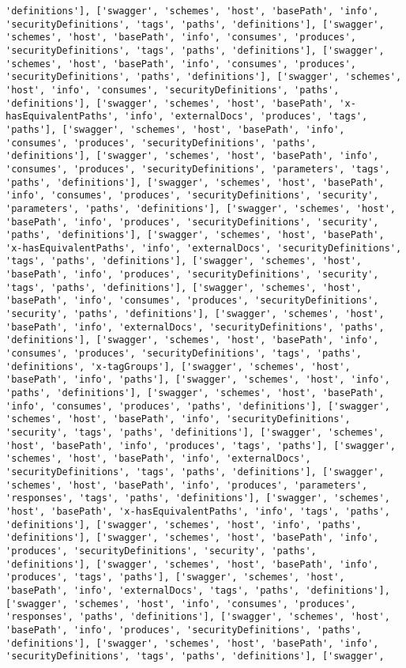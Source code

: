 \documentclass[11pt]{article}
\begin{document}
\begin{Verbatim}[commandchars=\\\{\}]
'definitions'], ['swagger', 'schemes', 'host', 'basePath', 'info', 'securityDefinitions', 'tags', 'paths', 'definitions'], ['swagger', 'schemes', 'host', 'basePath', 'info', 'consumes', 'produces', 'securityDefinitions', 'tags', 'paths', 'definitions'], ['swagger', 'schemes', 'host', 'basePath', 'info', 'consumes', 'produces', 'securityDefinitions', 'paths', 'definitions'], ['swagger', 'schemes', 'host', 'info', 'consumes', 'securityDefinitions', 'paths', 'definitions'], ['swagger', 'schemes', 'host', 'basePath', 'x-hasEquivalentPaths', 'info', 'externalDocs', 'produces', 'tags', 'paths'], ['swagger', 'schemes', 'host', 'basePath', 'info', 'consumes', 'produces', 'securityDefinitions', 'paths', 'definitions'], ['swagger', 'schemes', 'host', 'basePath', 'info', 'consumes', 'produces', 'securityDefinitions', 'parameters', 'tags', 'paths', 'definitions'], ['swagger', 'schemes', 'host', 'basePath', 'info', 'consumes', 'produces', 'securityDefinitions', 'security', 'parameters', 'paths', 'definitions'], ['swagger', 'schemes', 'host', 'basePath', 'info', 'produces', 'securityDefinitions', 'security', 'paths', 'definitions'], ['swagger', 'schemes', 'host', 'basePath', 'x-hasEquivalentPaths', 'info', 'externalDocs', 'securityDefinitions', 'tags', 'paths', 'definitions'], ['swagger', 'schemes', 'host', 'basePath', 'info', 'produces', 'securityDefinitions', 'security', 'tags', 'paths', 'definitions'], ['swagger', 'schemes', 'host', 'basePath', 'info', 'consumes', 'produces', 'securityDefinitions', 'security', 'paths', 'definitions'], ['swagger', 'schemes', 'host', 'basePath', 'info', 'externalDocs', 'securityDefinitions', 'paths', 'definitions'], ['swagger', 'schemes', 'host', 'basePath', 'info', 'consumes', 'produces', 'securityDefinitions', 'tags', 'paths', 'definitions', 'x-tagGroups'], ['swagger', 'schemes', 'host', 'basePath', 'info', 'paths'], ['swagger', 'schemes', 'host', 'info', 'paths', 'definitions'], ['swagger', 'schemes', 'host', 'basePath', 'info', 'consumes', 'produces', 'paths', 'definitions'], ['swagger', 'schemes', 'host', 'basePath', 'info', 'securityDefinitions', 'security', 'tags', 'paths', 'definitions'], ['swagger', 'schemes', 'host', 'basePath', 'info', 'produces', 'tags', 'paths'], ['swagger', 'schemes', 'host', 'basePath', 'info', 'externalDocs', 'securityDefinitions', 'tags', 'paths', 'definitions'], ['swagger', 'schemes', 'host', 'basePath', 'info', 'produces', 'parameters', 'responses', 'tags', 'paths', 'definitions'], ['swagger', 'schemes', 'host', 'basePath', 'x-hasEquivalentPaths', 'info', 'tags', 'paths', 'definitions'], ['swagger', 'schemes', 'host', 'info', 'paths', 'definitions'], ['swagger', 'schemes', 'host', 'basePath', 'info', 'produces', 'securityDefinitions', 'security', 'paths', 'definitions'], ['swagger', 'schemes', 'host', 'basePath', 'info', 'produces', 'tags', 'paths'], ['swagger', 'schemes', 'host', 'basePath', 'info', 'externalDocs', 'tags', 'paths', 'definitions'], ['swagger', 'schemes', 'host', 'info', 'consumes', 'produces', 'responses', 'paths', 'definitions'], ['swagger', 'schemes', 'host', 'basePath', 'info', 'produces', 'securityDefinitions', 'paths', 'definitions'], ['swagger', 'schemes', 'host', 'basePath', 'info', 'securityDefinitions', 'tags', 'paths', 'definitions'], ['swagger', 
\end{Verbatim}
\end{document}
